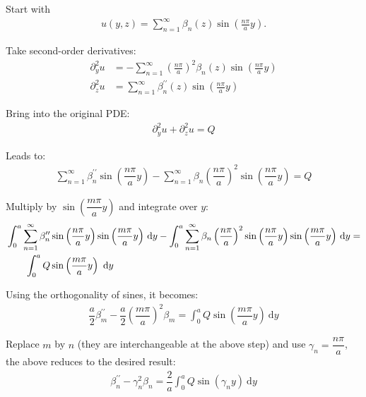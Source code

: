 \begin{solution} 

Start with
    \begin{align*}
      u\left(y, z\right) = \sum_{n=1}^{\infty}{\beta_{n}\left(z\right)\sin\left(\frac{n\pi}{a}y\right)}.
    \end{align*}

Take second-order derivatives:
    \begin{align*}
      \partial_{y}^{2}u &= - \sum_{n=1}^{\infty} (\frac{n\pi}{a})^2 {\beta_{n} \left(z\right)\sin\left(\frac{n\pi}{a}y\right)} \\
      \partial_{z}^{2}u &= \sum_{n=1}^{\infty}{\beta_{n}^{\prime\prime} \left(z\right)\sin\left(\frac{n\pi}{a}y\right)}
    \end{align*}

Bring into the original PDE:
    \begin{align*}
      \partial_{y}^{2}u + \partial_{z}^{2}u = Q
    \end{align*}

Leads to:
      \begin{align*}
        \sum_{n=1}^{\infty}{\beta_{n}^{\prime\prime}\sin\left(\dfrac{n\pi}{a}y\right)} -
\sum_{n=1}^{\infty}{\beta_{n}\left(\dfrac{n\pi}{a}\right)^{2}\sin\left(\dfrac{n\pi}{a}y\right)} = Q
      \end{align*}

Multiply by $\sin\left(\dfrac{m\pi}{a}y\right)$ and integrate over $y$:
      \begin{align*}
        &\int_{0}^{a}{\sum_{n=1}^{\infty}{\beta_{n}^{\prime\prime}\sin\left(\dfrac{n\pi}{a}y\right)\sin\left(\dfrac{m\pi}{a}y\right)}
\ \mathrm{d}y} -
\int_{0}^{a}{\sum_{n=1}^{\infty}{\beta_{n}\left(\dfrac{n\pi}{a}\right)^{2}\sin\left(\dfrac{n\pi}{a}y\right)\sin\left(\dfrac{m\pi}{a}y\right)}
\ \mathrm{d}y} = \nonumber \\
        &\hspace{2.0em}\int_{0}^{a}{Q\sin\left(\dfrac{m\pi}{a}y\right) \ \mathrm{d}y}
      \end{align*}

Using the orthogonality of sines, it becomes:
        \begin{align*}
           \dfrac{a}{2}\beta_{m}^{\prime\prime} - \dfrac{a}{2}(\dfrac{m\pi}{a})^{2}\beta_{m} =\int_{0}^{a}{Q\sin\left(\dfrac{m\pi}{a}y\right) \ \mathrm{d}y}
        \end{align*}

Replace $m$ by $n$ (they are interchangeable at the above step) and use $\gamma_{n}=\dfrac{n\pi}{a}$, the above reduces to the desired result:
        \begin{align*}
          \beta_{n}^{\prime\prime} - \gamma_{n}^{2}\beta_{n} = \dfrac{2}{a}\int_{0}^{a}{Q\sin\left(\gamma_{n}y\right) \ \mathrm{d}y}
        \end{align*}

\end{solution} 